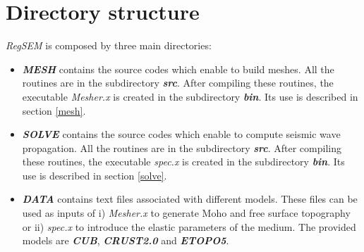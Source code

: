 \section{Directory structure}

 
\textit{RegSEM} is composed by three main directories:
\begin{itemize}[topsep=0pt]
\item \textit{\bfseries MESH} contains the source codes which enable to build meshes. All the routines
are in the subdirectory \textit{\bfseries src}. After compiling these routines, the executable
\textit{Mesher.x} is created in the subdirectory \textit{\bfseries bin}. Its use is described in
section \ref{mesh}.
\item \textit{\bfseries SOLVE} contains the source codes which enable to compute seismic wave
propagation. All the routines are in the subdirectory \textit{\bfseries src}. After compiling these
routines, the executable \textit{spec.x} is created in the subdirectory \textit{\bfseries bin}. Its
use is described in section \ref{solve}.
\item \textit{\bfseries DATA} contains text files associated with different models. These files can be
used as inputs of i) \textit{Mesher.x} to generate Moho and free surface topography or ii)  \textit{spec.x} to introduce the elastic parameters of the medium. The provided models are \textit{\bfseries CUB},
\textit{\bfseries CRUST2.0} and \textit{\bfseries ETOPO5}.
\end{itemize}